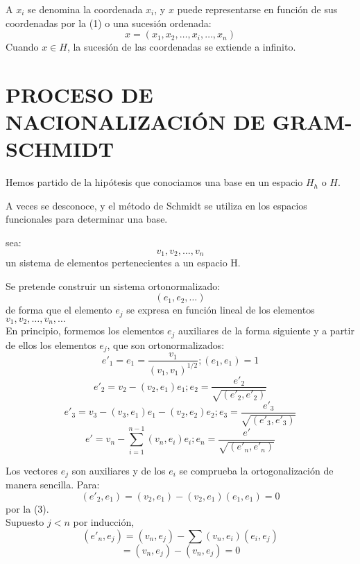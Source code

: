 A $ x_{i} $ se denomina la coordenada $ x_{i} $, y $ x $ puede representarse en función de sus
coordenadas por la (1) o una sucesión ordenada:
\begin{equation}
x = (x_{1}, x_{2}, \ldots, x_{i}, \ldots, x_{n})
\end{equation}
Cuando $ x \in H $, la sucesión de las coordenadas se extiende a infinito.

\section{PROCESO DE NACIONALIZACIÓN DE GRAM-SCHMIDT}

Hemos partido de la hipótesis que conociamos una base en un espacio $ H_{h} $ o $ H $.

A veces se desconoce, y el método de Schmidt se utiliza en los espacios funcionales
para determinar una base.

sea:
	\setcounter{equation}{0}%
\begin{equation}
v_{1}, v_{2}, \ldots,v_{n}
\end{equation}
un sistema de elementos pertenecientes a un espacio H.

Se pretende construir un sistema ortonormalizado:
\begin{equation}
(e_{1}, e_{2},  \ldots)
\end{equation}
de forma que el elemento $ e_{j} $ se expresa en función lineal de los elementos $ v_{1}, v_{2}, \ldots,v_{n}, \ldots $ \\

En principio, formemos los elementos $ e_{j} $  auxiliares de la forma siguiente y a partir
de ellos los elementos $ e_{j} $, que son ortonormalizados:
\[ e'_{1} = e_{1} = \frac{v_{1}}{(v_{1}, v_{1})^{1/2}} ;(e_{1}, e_{1}) = 1 \]
\[ e'_{2} = v_{2} - (v_{2}, e_{1})e_{1};  e_{2} = \frac{e'_{2}}{\sqrt{(e'_{2}, e'_{2})}} \]
\[ e'_{3} = v_{3} -(v_{3}, e_{1})e_{1}- (v_{2}, e_{2})e_{2};  e_{3} = \frac{e'_{3}}{\sqrt{(e'_{3}, e'_{3})}} \]
\begin{equation}
e' = v_{n} -\sum_{i = 1}^{n-1} (v_{n}, e_{i})e_{i};  e_{n} = \frac{e'}{\sqrt{(e'_{n}, e'_{n})}} 
\end{equation}

Los vectores $ e_{j} $ son auxiliares y de los $ e_{i} $ se comprueba la ortogonalización de manera sencilla. Para:
\[ (e'_{2}, e_{1}) = (v_{2}, e_{1}) - (v_{2}, e_{1})(e_{1}, e_{1}) = 0\]
por la (3).\\
Supuesto $ j < n $ por inducción,
\begin{equation}
(e'_{n}, e_{j}) = (v_{n}, e_{j}) - \sum (v_{n}, e_{i})(e_{i}, e_{j})
\end{equation}
\[ = (v_{n}, e_{j}) - (v_{n}, e_{j}) = 0 \]

